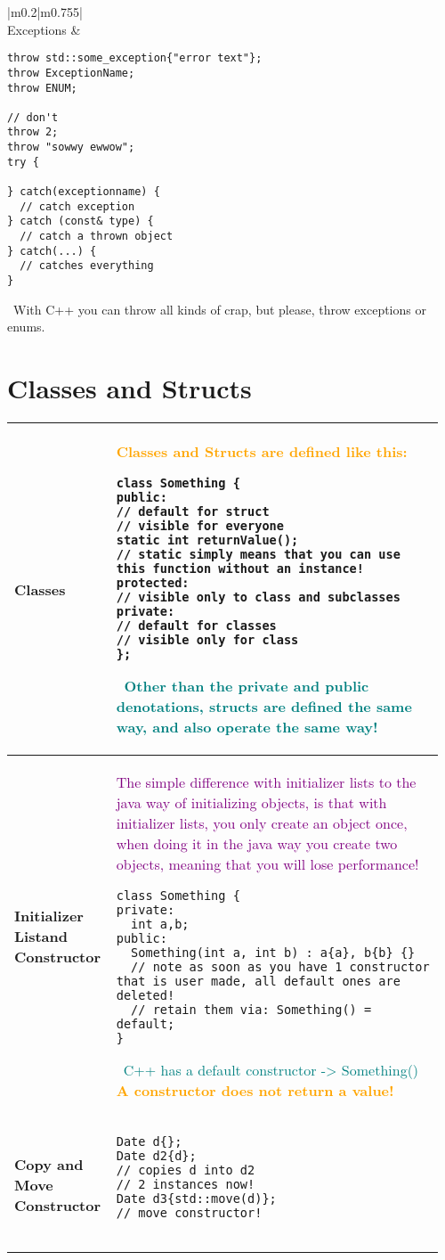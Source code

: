 \documentclass[main.tex,fontsize=8pt,paper=a4,paper=portrait,DIV=calc]{scrartcl}
\begin{document}
\begin{table}[ht!]
\begin{tabular}{|m{0.2\linewidth}|m{0.755\linewidth}|}
\\
\hline
Exceptions & 
\begin{lstlisting}
throw std::some_exception{"error text"};
throw ExceptionName;
throw ENUM;

// don't
throw 2;
throw "sowwy ewwow";
try {

} catch(exceptionname) {
  // catch exception
} catch (const& type) {
  // catch a thrown object
} catch(...) {
  // catches everything
}
\end{lstlisting}
\, \newline
With C++ you can throw all kinds of crap, but please, throw exceptions or enums.\\
\hline
\end{tabular}
\end{table}
\pagebreak
\begin{table}[ht!]
\section{Classes and Structs}
\begin{tabular}{|m{0.2\linewidth}|m{0.755\linewidth}|}
\hline
Classes &
\textcolor{orange}{Classes and Structs are defined like this:}\newline
\begin{lstlisting}
class Something { 
public:
// default for struct
// visible for everyone
static int returnValue();
// static simply means that you can use this function without an instance!
protected:
// visible only to class and subclasses
private:
// default for classes
// visible only for class
};
\end{lstlisting}
\, \newline
\textcolor{teal}{Other than the private and public denotations, structs are defined the same way, and also operate the same way!}\\
\hline
\textbf{Initializer List\newline and Constructor} &
\textcolor{purple}{The simple difference with initializer lists to the java way of initializing objects, is that with initializer lists, you only create an object once, when doing it in the java way you create two objects, meaning that you will lose performance!}\newline
\begin{lstlisting}
class Something {
private:
  int a,b;
public:
  Something(int a, int b) : a{a}, b{b} {}
  // note as soon as you have 1 constructor that is user made, all default ones are deleted!
  // retain them via: Something() = default;
}
\end{lstlisting}
\, \newline
\textcolor{teal}{C++ has a default constructor -> Something()}\newline
\textcolor{orange}{\textbf{A constructor does not return a value!}}\\
\hline
\textbf{Copy and Move Constructor} & 
\begin{lstlisting}
Date d{};
Date d2{d};
// copies d into d2
// 2 instances now!
Date d3{std::move(d)};
// move constructor!


\end{lstlisting}
\end{tabular}
\end{table}
\end{document}
